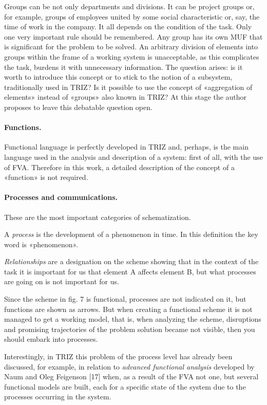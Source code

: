 \documentclass[11pt,a4paper]{book}
\begin{document}
Groups can be not only departments and divisions. It can be project groups or,
for example, groups of employees united by some social characteristic or, say,
the time of work in the company. It all depends on the condition of the task.
Only one very important rule should be remembered. Any group has its own MUF
that is significant for the problem to be solved. An arbitrary division of
elements into groups within the frame of a working system is unacceptable, as
this complicates the task, burdens it with unnecessary information.  The
question arises: is it worth to introduce this concept or to stick to the
notion of a subsystem, traditionally used in TRIZ? Is it possible to use the
concept of «aggregation of elements» instead of «groups» also known in TRIZ?
At this stage the author proposes to leave this debatable question open.

\paragraph{Functions.}
Functional language is perfectly developed in TRIZ and, perhaps, is the main
language used in the analysis and description of a system: first of all, with
the use of FVA. Therefore in this work, a detailed description of the concept
of a «function» is not required.

\paragraph{Processes and communications.}
These are the most important categories of schematization.

A \emph{process} is the development of a phenomenon in time. In this
definition the key word is «phenomenon».

\emph{Relationships} are a designation on the scheme showing that in the
context of the task it is important for us that element A affects element B,
but what processes are going on is not important for us.

Since the scheme in fig. 7 is functional, processes are not indicated on it,
but functions are shown as arrows. But when creating a functional scheme it is
not managed to get a working model, that is, when analyzing the scheme,
disruptions and promising trajectories of the problem solution became not
visible, then you should embark into processes.

Interestingly, in TRIZ this problem of the process level has already been
discussed, for example, in relation to \emph{advanced functional analysis}
developed by Naum and Oleg Feigenson [17] when, as a result of the FVA not
one, but several functional models are built, each for a specific state of the
system due to the processes occurring in the system.
\end{document}
